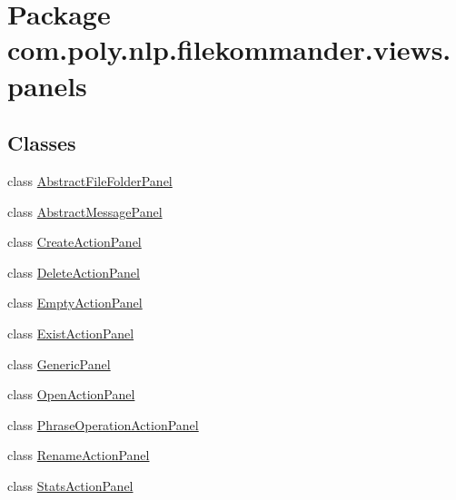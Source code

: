 \hypertarget{namespacecom_1_1poly_1_1nlp_1_1filekommander_1_1views_1_1panels}{\section{Package com.\-poly.\-nlp.\-filekommander.\-views.\-panels}
\label{namespacecom_1_1poly_1_1nlp_1_1filekommander_1_1views_1_1panels}
}
\subsection*{Classes}
\begin{DoxyCompactItemize}
\item 
class \hyperlink{classcom_1_1poly_1_1nlp_1_1filekommander_1_1views_1_1panels_1_1_abstract_file_folder_panel}{Abstract\-File\-Folder\-Panel}
\item 
class \hyperlink{classcom_1_1poly_1_1nlp_1_1filekommander_1_1views_1_1panels_1_1_abstract_message_panel}{Abstract\-Message\-Panel}
\item 
class \hyperlink{classcom_1_1poly_1_1nlp_1_1filekommander_1_1views_1_1panels_1_1_create_action_panel}{Create\-Action\-Panel}
\item 
class \hyperlink{classcom_1_1poly_1_1nlp_1_1filekommander_1_1views_1_1panels_1_1_delete_action_panel}{Delete\-Action\-Panel}
\item 
class \hyperlink{classcom_1_1poly_1_1nlp_1_1filekommander_1_1views_1_1panels_1_1_empty_action_panel}{Empty\-Action\-Panel}
\item 
class \hyperlink{classcom_1_1poly_1_1nlp_1_1filekommander_1_1views_1_1panels_1_1_exist_action_panel}{Exist\-Action\-Panel}
\item 
class \hyperlink{classcom_1_1poly_1_1nlp_1_1filekommander_1_1views_1_1panels_1_1_generic_panel}{Generic\-Panel}
\item 
class \hyperlink{classcom_1_1poly_1_1nlp_1_1filekommander_1_1views_1_1panels_1_1_open_action_panel}{Open\-Action\-Panel}
\item 
class \hyperlink{classcom_1_1poly_1_1nlp_1_1filekommander_1_1views_1_1panels_1_1_phrase_operation_action_panel}{Phrase\-Operation\-Action\-Panel}
\item 
class \hyperlink{classcom_1_1poly_1_1nlp_1_1filekommander_1_1views_1_1panels_1_1_rename_action_panel}{Rename\-Action\-Panel}
\item 
class \hyperlink{classcom_1_1poly_1_1nlp_1_1filekommander_1_1views_1_1panels_1_1_stats_action_panel}{Stats\-Action\-Panel}
\end{DoxyCompactItemize}
